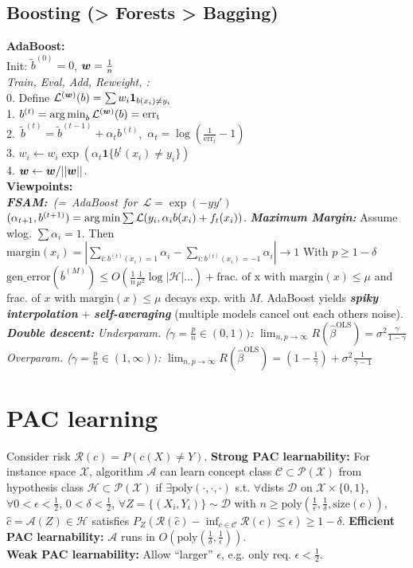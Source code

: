 \subsection*{Boosting (> Forests > Bagging)}
\textbf{AdaBoost:}\\
Init: $\tilde{b}^{(0)}=0$, ${\bm{w}}=\frac{1}{n}$\\
\emph{Train, Eval, Add, Reweight, {\tiny\CircArrowRight{}}:}\\
0. Define $\mathcal{L}^{({\bm{w}})}(b)=\sum w_i\mathbf{1}_{b(x_i)\neq y_i}$\\
1. $b^{(t)} = \operatorname*{arg\,min}_b \mathcal{L}^{({\bm{w}})}(b) = \mathrm{err_t}$\\
\mbox{2. $\tilde{b}^{(t)}\!=\!\tilde{b}^{(t-1)}\!+\!\alpha_t b^{(t)}$, $\alpha_t\!=\!\log(\frac{1}{\mathrm{err}_t}-1)$}\\
3. $w_i \leftarrow w_i\exp(\alpha_t\mathbf{1}\{b^{t}(x_i) \neq y_i\})$\\
4. ${\bm{w}} \leftarrow {\bm{w}} / ||{\bm{w}}||$.\\
\textbf{Viewpoints:}\\
\mbox{\emph{\textbf{FSAM:}} \emph{(= AdaBoost for $\mathcal{L}=\exp(-yy')$}}
$(\alpha_{t+1}, b^{(t+1)}) = \operatorname*{arg\,min}\sum\mathcal{L}(y_i, \alpha_i b(x_i) + f_t(x_i))$.
\emph{\textbf{Maximum Margin:}} Assume wlog. $\sum \alpha_i = 1$. Then $\mathrm{margin}(x_i)=|\sum_{i:b^{(t)}(x_i)=1}\alpha_i - \sum_{i:b^{(t)}(x_i)=-1}\alpha_i| \to 1$
With $p\geq 1-\delta$ $\mathrm{gen\_error}(\bar{b}^{(M)}) \leq O(\frac{1}{n}\frac{1}{\mu^2}\log|\mathcal{H}|\ldots) + \textrm{frac. of x with margin}(x) \leq \mu$ and frac. of $x$ with $\mathrm{margin}(x) \leq \mu$ decays exp. with $M$. AdaBoost yields 
\emph{\textbf{spiky interpolation}} + \emph{\textbf{self-averaging}} (multiple models cancel out each others noise). \emph{\textbf{Double descent:}} \emph{Underparam. ($\gamma = \frac{p}{n}\in(0,1))$:} $\lim_{n,p\to\infty} R(\hat{\beta}^{\mathrm{OLS}}) = \sigma^2\frac{\gamma}{1-\gamma}$ \emph{Overparam. ($\gamma = \frac{p}{n}\in(1,\infty))$:} $\lim_{n,p\to\infty} R(\hat{\beta}^{\mathrm{OLS}}) = (1-\frac{1}{\gamma})+\sigma^2\frac{1}{\gamma-1}$ 

\section*{PAC learning}
Consider risk $\mathcal{R}(c) = P(c(X)\neq Y)$.
\textbf{Strong PAC learnability:}
For instance space $\mathcal{X}$, algorithm $\mathcal{A}$ can learn concept class
$\mathcal{C}\subset\mathcal{P}(\mathcal{X})$ from hypothesis class $\mathcal{H}\subset\mathcal{P}(\mathcal{X})$ if $\exists\mathrm{poly}(\cdot,\cdot,\cdot)$ s.t.
$\forall$dists $\mathcal{D}$ on $\mathcal{X}\times\{0,1\}$, $\forall 0<\epsilon<\frac{1}{2}$, $0<\delta<\frac{1}{2}$, $\forall Z=\{(X_i,Y_i)\}\sim\mathcal{D}$ with $n\geq\mathrm{poly}(\frac{1}{\epsilon},\frac{1}{\delta},\mathrm{size}(c))$, $\hat{c} = \mathcal{A}(Z)\in\mathcal{H}$ satisfies $P_Z(\mathcal{R}(\hat{c})-\inf_{c\in\mathcal{C}}\mathcal{R}(c)\leq\epsilon) \geq 1-\delta$.
\textbf{Efficient PAC learnability:} $\mathcal{A}$ runs in $O(\mathrm{poly}(\frac{1}{\delta},\frac{1}{\epsilon}))$.\\
\textbf{Weak PAC learnability:} Allow ``larger'' $\epsilon$, e.g. only req. $\epsilon < \frac{1}{2}$.

